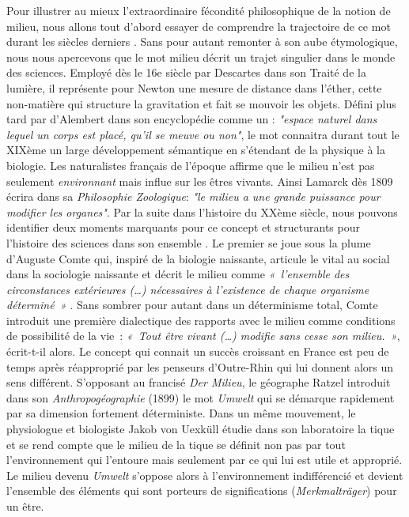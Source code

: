 Pour illustrer au mieux l’extraordinaire fécondité philosophique de la notion de milieu, nous allons tout d’abord essayer de comprendre la trajectoire de ce mot durant les siècles derniers \citep{Canguilhem1965}. Sans pour autant remonter à son aube étymologique, nous nous apercevons que le mot milieu décrit un trajet singulier dans le monde des sciences. Employé dès le 16e siècle par Descartes dans son Traité de la lumière, il représente pour Newton une mesure de distance dans l’éther, cette non-matière qui structure la gravitation et fait se mouvoir les objets. Défini plus tard par d'Alembert dans son encyclopédie comme un : \textit{"espace naturel dans lequel un corps est placé, qu'il se meuve ou non"}, le mot connaitra durant tout le XIXème un large développement sémantique en s'étendant de la physique à la biologie. Les naturalistes français de l’époque affirme que le milieu n’est pas seulement \textit{environnant} mais influe sur les êtres vivants. Ainsi Lamarck dès 1809 écrira dans sa \textit{Philosophie Zoologique}: \textit{"le milieu a une grande puissance pour modifier les organes"}. Par la suite dans l’histoire du XXème siècle, nous pouvons identifier deux moments marquants pour ce concept et structurants pour l’histoire des sciences dans son ensemble \citep{Taylan2010}. 
Le premier se joue sous la plume d’Auguste Comte qui, inspiré de la biologie naissante, articule le vital au social dans la sociologie naissante et décrit le milieu comme \textit{« l’ensemble des circonstances extérieures (…) nécessaires à l’existence de chaque organisme déterminé »} \citep{Comte1838}. Sans sombrer pour autant dans un déterminisme total, Comte introduit une première dialectique des rapports avec le milieu comme conditions de possibilité de la vie : \textit{« Tout être vivant (…) modifie sans cesse son milieu. »}, écrit-t-il alors. 
Le concept qui connait un succès croissant en France est peu de temps après réapproprié par les penseurs d’Outre-Rhin qui lui donnent alors un sens différent. S’opposant au francisé \textit{Der Milieu}, le géographe Ratzel introduit dans son \textit{Anthropogéographie} (1899) le mot \textit{Umwelt} qui se démarque rapidement par sa dimension fortement déterministe. Dans un même mouvement, le physiologue et biologiste Jakob von Uexküll étudie dans son laboratoire la tique et se rend compte que le milieu de la tique se définit non pas par tout l’environnement qui l’entoure mais seulement par ce qui lui est utile et approprié. Le milieu devenu \textit{Umwelt} s’oppose alors à l’environnement indifférencié et devient l’ensemble des éléments qui sont porteurs de significations (\textit{Merkmalträger}) pour un être. 

